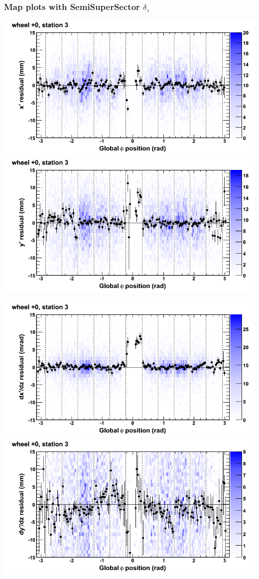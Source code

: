 \documentclass[compress]{beamer}
\begin{document}
\begin{frame}
\frametitle{Map plots with SemiSuperSector $\delta_z$}
\includegraphics[width=0.5\linewidth]{zfit_mapplots/DTvsphi_st3whC_x.png}
\includegraphics[width=0.5\linewidth]{zfit_mapplots/DTvsphi_st3whC_y.png}

\includegraphics[width=0.5\linewidth]{zfit_mapplots/DTvsphi_st3whC_dxdz.png}
\includegraphics[width=0.5\linewidth]{zfit_mapplots/DTvsphi_st3whC_dydz.png}
\end{frame}
\end{document}
